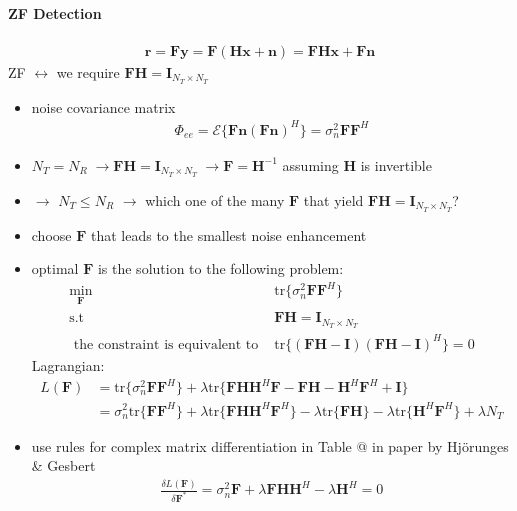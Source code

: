 \documentclass[a4paper, 10pt]{article}
\makeatletter
\newcommand{\Rmnum}[1]{\expandafter\@slowromancap\romannumeral #1@}
\makeatother
\begin{document}
\paragraph{ZF Detection}
\begin{align*}
	\mathbf{r}=\mathbf{Fy}=\mathbf{F}(\mathbf{Hx}+\mathbf{n})=\mathbf{FHx}+\mathbf{Fn}
\end{align*}
ZF $\leftrightarrow$ we require $\mathbf{FH}=\mathbf{I}_{N_T \times N_T}$
\begin{itemize}
	\item noise covariance matrix
	\begin{align*}
		\Phi_{ee}=\mathcal{E}\{\mathbf{Fn}(\mathbf{Fn})^H\}=\sigma_n^2\mathbf{FF}^H
	\end{align*}
	\item $N_T=N_R \; \rightarrow \mathbf{FH}=\mathbf{I}_{N_T \times N_T} \; \rightarrow \mathbf{F}=\mathbf{H}^{-1}$ assuming $\mathbf{H}$ is invertible
	\item $\rightarrow$ $N_T \leq N_R$ $\rightarrow$ which one of the many $\mathbf{F}$ that yield $\mathbf{FH}=\mathbf{I}_{N_T \times N_T}$?
	\item choose $\mathbf{F}$ that leads to the smallest noise enhancement
	\item optimal $\mathbf{F}$ is the solution to the following problem:
	\begin{align*}
		\underset{\mathbf{F}}{\mathrm{min}} \;& \mathrm{tr}\{\sigma_n^2\mathbf{FF}^H\}\\
		\text{s.t } &\mathbf{FH}=\mathbf{I}_{N_T \times N_T}\\
		\text{ the constraint} \text{ is equivalent to }
		&\mathrm{tr}\{(\mathbf{FH}-\mathbf{I})(\mathbf{FH}-\mathbf{I})^H\}=0
	\end{align*}
Lagrangian:
	\begin{align*}
		L(\mathbf{F})&=\mathrm{tr}\{\sigma_n^2\mathbf{FF}^H\}+\lambda \mathrm{tr}\{\mathbf{FHH}^H\mathbf{F}-\mathbf{FH}-\mathbf{H}^H\mathbf{F}^H+\mathbf{I}\}\\
			&=\sigma_n^2\mathrm{tr}\{\mathbf{FF}^H\}+\lambda \mathrm{tr}\{\mathbf{FHH}^H\mathbf{F}^H\}-\lambda\mathrm{tr}\{\mathbf{FH}\}
			-\lambda\mathrm{tr}\{\mathbf{H}^H\mathbf{F}^H\}+\lambda N_T
	\end{align*}
	\item use rules for complex matrix differentiation in Table \Rmnum{4} in paper by Hj\"orunges \& Gesbert
	\begin{align*}
		\frac{\delta L(\mathbf{F})}{\delta \mathbf{F}^*}=\sigma_n^2\mathbf{F}+\lambda\mathbf{FHH}^H-\lambda\mathbf{H}^H=0\\

\end{align*}
\end{itemize}
\end{document}
